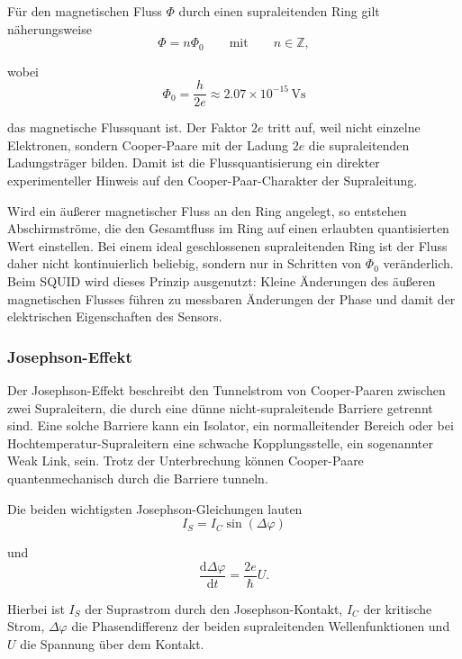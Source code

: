 \documentclass{article}
\begin{document}
Für den magnetischen Fluss $\Phi$ durch einen supraleitenden Ring gilt näherungsweise
\begin{equation}
    \Phi = n\Phi_0 \qquad \text{mit} \qquad n\in \mathbb{Z},
\end{equation}

wobei
\begin{equation}
    \Phi_0 = \frac{h}{2e} \approx 2.07 \times 10^{-15}\,\mathrm{Vs}
\end{equation}

das magnetische Flussquant ist. Der Faktor $2e$ tritt auf, weil nicht einzelne Elektronen, sondern Cooper-Paare mit der Ladung $2e$ die supraleitenden Ladungsträger bilden. Damit ist die Flussquantisierung ein direkter experimenteller Hinweis auf den Cooper-Paar-Charakter der Supraleitung.

Wird ein äußerer magnetischer Fluss an den Ring angelegt, so entstehen Abschirmströme, die den Gesamtfluss im Ring auf einen erlaubten quantisierten Wert einstellen. Bei einem ideal geschlossenen supraleitenden Ring ist der Fluss daher nicht kontinuierlich beliebig, sondern nur in Schritten von $\Phi_0$ veränderlich. Beim SQUID wird dieses Prinzip ausgenutzt: Kleine Änderungen des äußeren magnetischen Flusses führen zu messbaren Änderungen der Phase und damit der elektrischen Eigenschaften des Sensors. \cite{mr_squid} 

\subsubsection{Josephson-Effekt}

Der Josephson-Effekt beschreibt den Tunnelstrom von Cooper-Paaren zwischen zwei Supraleitern, die durch eine dünne nicht-supraleitende Barriere getrennt sind. Eine solche Barriere kann ein Isolator, ein normalleitender Bereich oder bei Hochtemperatur-Supraleitern eine schwache Kopplungsstelle, ein sogenannter Weak Link, sein. Trotz der Unterbrechung können Cooper-Paare quantenmechanisch durch die Barriere tunneln.

Die beiden wichtigsten Josephson-Gleichungen lauten
\begin{equation}
    I_S = I_C \sin(\Delta\varphi)
\end{equation}

und
\begin{equation}
    \frac{\mathrm{d}\Delta\varphi}{\mathrm{d}t}=\frac{2e}{\hbar}U.
\end{equation}

Hierbei ist $I_S$ der Suprastrom durch den Josephson-Kontakt, $I_C$ der kritische Strom, $\Delta\varphi$ die Phasendifferenz der beiden supraleitenden Wellenfunktionen und $U$ die Spannung über dem Kontakt.
\end{document}
